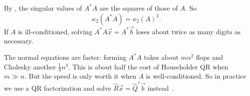 By , the singular values of $A^\ast A$ are the squares of those of $A$. So
\begin{equation}
  \kappa_2(A^\ast A) = \kappa_2(A)^2.
\end{equation}
If $A$ is ill-conditioned, solving $A^\ast A\vec{x} = A^\ast\vec{b}$ loses about twice as many digits as necessary.

The normal equations are faster: forming $A^\ast A$ takes about $mn^2$ flops and Cholesky another $\frac{1}{3}n^3$. This is about half the cost of Householder QR when $m \gg n$. But the speed is only worth it when $A$ is well-conditioned. So in practice we use a QR factorization and solve $\hat{R}\vec{x} = \hat{Q}^\ast\vec{b}$ instead~\cite[Lecture 11]{TB}.
